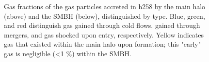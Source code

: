 \documentclass[manuscript]{aastex}
\begin{document}
\begin{figure}
\centerline{}
\centerline{}
\caption[]{Gas fractions of the gas particles accreted in h258 by the main halo (above) and the SMBH (below), distinguished by type. Blue, green, and red distinguish gas gained through cold flows, gained through mergers, and gas shocked upon entry, respectively. Yellow indicates gas that existed within the main halo upon formation; this "early" gas is negligible (<1 \%) within the SMBH.}
\label{h258piefrac} 
\end{figure}
\end{document}
